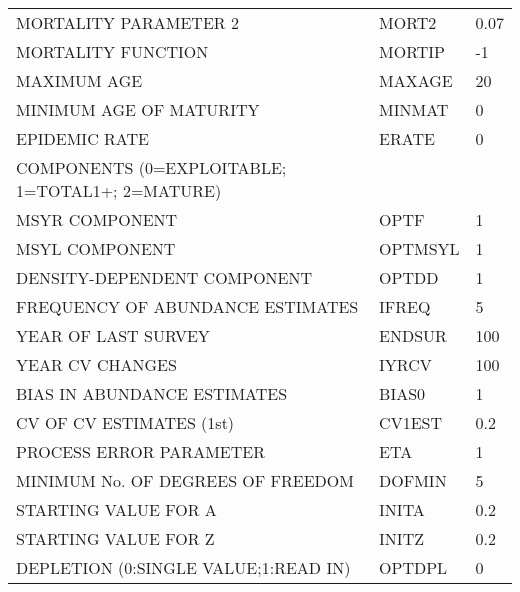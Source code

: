 \begin{table}[ht]
\begin{tabular}{lll}
  MORTALITY PARAMETER 2                 & MORT2   & 0.07 \\ 
  MORTALITY FUNCTION                    & MORTIP  & -1   \\ 
  MAXIMUM AGE                           & MAXAGE  & 20   \\ 
  MINIMUM AGE OF MATURITY               & MINMAT  & 0    \\ 
  EPIDEMIC RATE                         & ERATE   & 0    \\ 
  COMPONENTS (0=EXPLOITABLE; 1=TOTAL1+; 2=MATURE) &  &      \\ 
  MSYR COMPONENT                        & OPTF    & 1    \\ 
  MSYL COMPONENT                        & OPTMSYL & 1    \\ 
  DENSITY-DEPENDENT COMPONENT           & OPTDD   & 1    \\ 
  FREQUENCY OF ABUNDANCE ESTIMATES      & IFREQ   & 5    \\ 
  YEAR OF LAST SURVEY                   & ENDSUR  & 100  \\ 
  YEAR CV CHANGES                       & IYRCV   & 100  \\ 
  BIAS IN ABUNDANCE ESTIMATES           & BIAS0   & 1    \\ 
  CV OF CV ESTIMATES (1st)              & CV1EST  & 0.2  \\ 
  PROCESS ERROR PARAMETER               & ETA     & 1    \\ 
  MINIMUM No. OF DEGREES OF FREEDOM     & DOFMIN  & 5    \\ 
  STARTING VALUE FOR A                  & INITA   & 0.2  \\ 
  STARTING VALUE FOR Z                  & INITZ   & 0.2  \\ 
  DEPLETION (0:SINGLE VALUE;1:READ IN)  & OPTDPL  & 0    \\ 
   \hline
\end{tabular}
\end{table}
